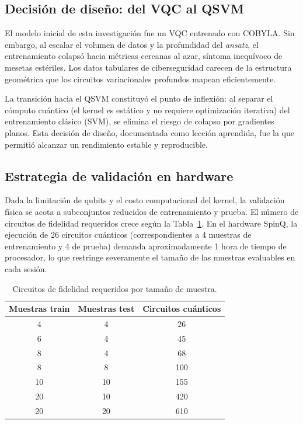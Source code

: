 \documentclass[10pt,conference]{IEEEtran}
\begin{document}
\subsection{Decisión de diseño: del VQC al QSVM}
El modelo inicial de esta investigación fue un VQC entrenado con
COBYLA. Sin embargo, al escalar el volumen de datos y la profundidad
del \textit{ansatz}, el entrenamiento colapsó hacia métricas cercanas
al azar, síntoma inequívoco de mesetas estériles. Los datos tabulares
de ciberseguridad carecen de la estructura geométrica que los circuitos
variacionales profundos mapean eficientemente.

La transición hacia el QSVM constituyó el punto de inflexión: al
separar el cómputo cuántico (el kernel es estático y no requiere
optimización iterativa) del entrenamiento clásico (SVM), se elimina el
riesgo de colapso por gradientes planos. Esta decisión de diseño,
documentada como lección aprendida, fue la que permitió alcanzar un
rendimiento estable y reproducible.

\subsection{Estrategia de validación en hardware}
Dada la limitación de qubits y el costo computacional del kernel, la
validación física se acota a subconjuntos reducidos de entrenamiento y
prueba. El número de circuitos de fidelidad requeridos crece según la
Tabla~\ref{tab:complejidad}. En el hardware SpinQ, la ejecución de 26
circuitos cuánticos (correspondientes a 4 muestras de entrenamiento y 4
de prueba) demanda aproximadamente 1 hora de tiempo de procesador, lo
que restringe severamente el tamaño de las muestras evaluables en cada
sesión.

\begin{table}[!t]
\centering
\caption{Circuitos de fidelidad requeridos por tamaño de muestra.}
\label{tab:complejidad}
\begin{tabular}{@{}ccc@{}}
\toprule
Muestras train & Muestras test & Circuitos cuánticos \\
\midrule
4  & 4  & 26 \\
6  & 4  & 45 \\
8  & 4  & 68 \\
8  & 8  & 100 \\
10 & 10 & 155 \\
20 & 10 & 420 \\
20 & 20 & 610 \\
\bottomrule
\end{tabular}
\end{table}
\end{document}
